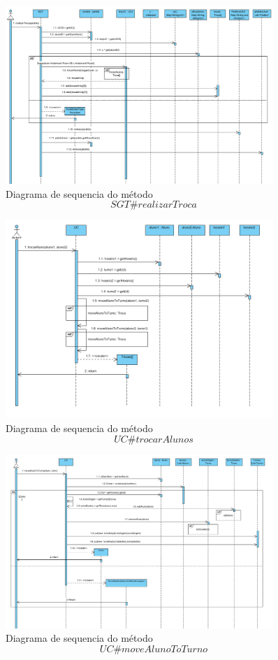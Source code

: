 \documentclass[12pt,a4paper]{report}
\begin{document}
\begin{figure}[H]
	\centering 
	\includegraphics[width=0.9\textwidth]{modelacao/diagramas_de_sequencia/realizarTroca/realizarTroca.png}
	\caption{Diagrama de sequencia do método $$SGT\#realizarTroca$$}
\end{figure}
\begin{figure}[H]
	\centering 
	\includegraphics[width=0.9\textwidth]{modelacao/diagramas_de_sequencia/realizarTroca/trocarAlunos.png}
	\caption{Diagrama de sequencia do método $$UC\#trocarAlunos$$}
\end{figure}
\begin{figure}[H]
	\centering 
	\includegraphics[width=0.9\textwidth]{modelacao/diagramas_de_sequencia/realizarTroca/moveAlunoToTurno.png}
	\caption{Diagrama de sequencia do método $$UC\#moveAlunoToTurno$$}
	\label{fig:moveAlunoToTurno}
\end{figure}
\end{document}
